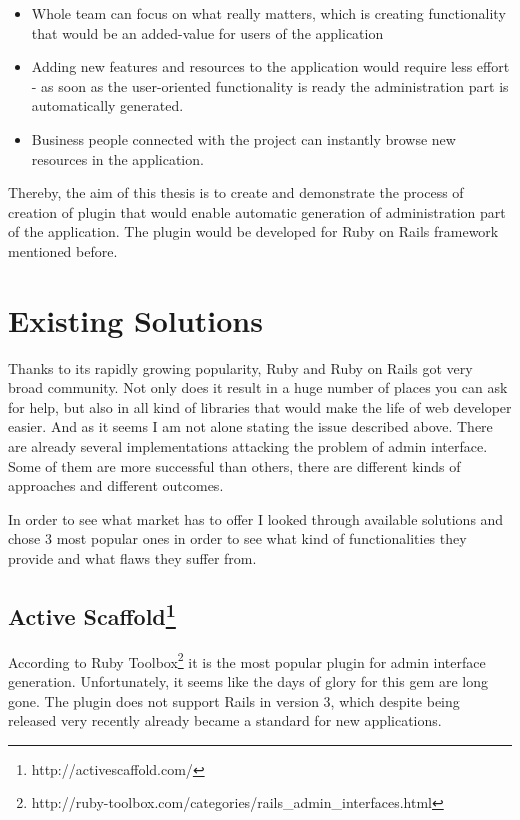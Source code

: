   \begin{itemize}
	  \item Whole team can focus on what really matters, which is creating functionality that would be an added-value for users of the application
	  \item Adding new features and resources to the application would require less effort - as soon as the user-oriented functionality is ready the administration part is automatically generated.
	  \item Business people connected with the project can instantly browse new resources in the application.
	\end{itemize}
  
  Thereby, the aim of this thesis is to create and demonstrate the process of creation of plugin that would enable automatic generation of administration part of the application. The plugin would be developed for Ruby on Rails framework mentioned before.
  
  \section{Existing Solutions}
  Thanks to its rapidly growing popularity, Ruby and Ruby on Rails got very broad community. Not only does it result in a huge number of places you can ask for help, but also in all kind of libraries that would make the life of web developer easier. And as it seems I am not alone stating the issue described above. There are already several implementations attacking the problem of admin interface. Some of them are more successful than others, there are different kinds of approaches and different outcomes. 
  
  In order to see what market has to offer I looked through available solutions and chose 3 most popular ones in order to see what kind of functionalities they provide and what flaws they suffer from. 
  
    \subsection[Active Scaffold] {Active Scaffold\footnote{http://activescaffold.com/}}
      According to Ruby Toolbox\footnote{http://ruby-toolbox.com/categories/rails\_admin\_interfaces.html} it is the most popular plugin for admin interface generation. Unfortunately, it seems like the days of glory for this gem are long gone. The plugin does not support Rails in version 3, which despite being released very recently already became a standard for new applications. 
      
